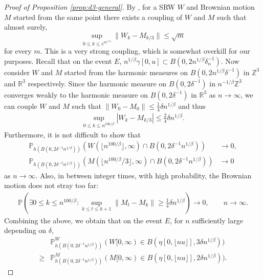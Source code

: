 \documentclass{article}
\newcommand{\R}{\mathbb{R}}
\newcommand{\Z}{\mathbb{Z}}
\renewcommand{\P}{\mathbb{P}}
\newcommand{\1}{\mathbf{1}}
\theoremstyle{definition}
\numberwithin{equation}{section}
\numberwithin{theorem}{section}
\begin{document}
\begin{proof}[Proof of Proposition \ref{prop:d3-general}]
By \cite[Theorem 2]{einmahl1989extensions}, for a SRW $W$ and Brownian motion $M$ started from the same point there exists a coupling of $W$ and $M$ such that almost surely,
\begin{equation}
        \sup_{0\leq k\leq e^{m^{1/4}}}\|W_{k}-M_{k/3}\|\leq\sqrt{m}
\end{equation}
for every $m$. This is a very strong coupling, which is somewhat overkill for our purposes. Recall that on the event $E$, $n^{1/\beta}\gamma[0,u]\subset B(0,2n^{1/\beta}\delta_n^{-1})$. Now consider $W$ and $M$ started from the harmonic measures on $B(0,2n^{1/\beta}\delta^{-1})$ in $\Z^3$ and $\R^3$ respectively. Since the harmonic measure on $B(0,2\delta^{-1})$ in $n^{-1/\beta}\Z^3$ converges weakly to the harmonic measure on $B(0,2\delta^{-1})$ in $\R^3$ as $n\rightarrow\infty$, we can couple $W$ and $M$ such that $\|W_0-M_0\|\leq\frac{1}{4}\delta n^{1/\beta}$ and thus
\begin{equation}
    \begin{split}
        \sup_{0\leq k\leq n^{100/\beta}}|W_{k}-M_{k/3}|\leq\frac{2}{4}\delta n^{1/\beta}.
    \end{split}
\end{equation}
Furthermore, it is not difficult to show that 
\begin{align}
    \P_{h(B(0,2\delta^{-1}n^{1/\beta}))}(W(\lfloor n^{100/\beta}\rfloor,\infty)\cap B(0,2\delta^{-1}n^{1/\beta}))&\rightarrow0,\\
    \P_{h(B(0,2\delta^{-1}n^{1/\beta}))}(M(\lfloor n^{100/\beta}/3\rfloor,\infty)\cap B(0,2\delta^{-1}n^{1/\beta}))&\rightarrow0
\end{align}
as $n\rightarrow\infty$. Also, in between integer times, with high probability, the Brownian motion does not stray too far:
\begin{equation}
    \begin{split}
        \P\left(\exists0\leq k\leq n^{100/\beta}\colon \sup_{k\leq t\leq k+1}\|M_t-M_k\|\geq\frac{1}{4}\delta n^{1/\beta}\right)\rightarrow0,\qquad n\rightarrow\infty.
    \end{split}
\end{equation}
Combining the above, we obtain that on the event $E$, for $n$ sufficiently large depending on $\delta$, 
\begin{equation}
    \begin{split}
        &\P^W_{h(B(0,2\delta^{-1}n^{1/\beta}))}(W[0,\infty)\in B(\eta[0,\lfloor nu\rfloor],3\delta n^{1/\beta}))\\
        \geq&\P^M_{h(B(0,2\delta^{-1}n^{1/\beta}))}(M[0,\infty)\in B(\eta[0,\lfloor nu\rfloor],2\delta n^{1/\beta})).

\end{split}
\end{equation}
\end{proof}
\end{document}
